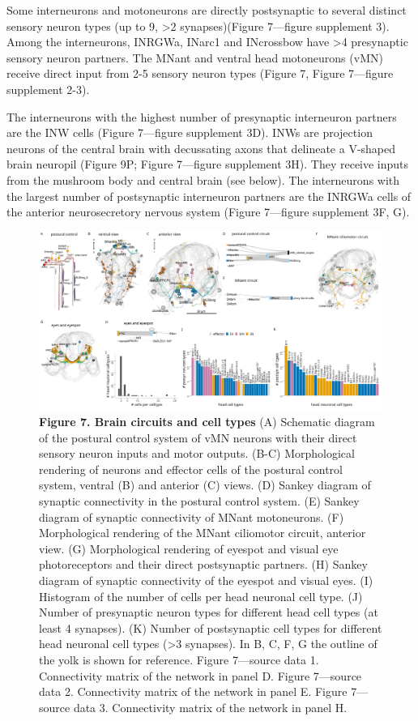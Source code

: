 \documentclass[
  11pt,
]{article}
\begin{document}
Some interneurons and motoneurons are directly postsynaptic to several
distinct sensory neuron types (up to 9, \textgreater2 synapses)(Figure
7---figure supplement 3). Among the interneurons, INRGWa, INarc1 and
INcrossbow have \textgreater4 presynaptic sensory neuron partners. The
MNant and ventral head motoneurons (vMN) receive direct input from 2-5
sensory neuron types (Figure 7, Figure 7---figure supplement 2-3).

The interneurons with the highest number of presynaptic interneuron
partners are the INW cells (Figure 7---figure supplement 3D). INWs are
projection neurons of the central brain with decussating axons that
delineate a V-shaped brain neuropil (Figure 9P; Figure 7---figure
supplement 3H). They receive inputs from the mushroom body and central
brain (see below). The interneurons with the largest number of
postsynaptic interneuron partners are the INRGWa cells of the anterior
neurosecretory nervous system (Figure 7---figure supplement 3F, G).

\begin{figure}[H]

{\centering \includegraphics[width=1\textwidth,height=\textheight]{Figures/Figure7.png}

}

\caption{\textbf{Figure 7. Brain circuits and cell types} (A) Schematic
diagram of the postural control system of vMN neurons with their direct
sensory neuron inputs and motor outputs. (B-C) Morphological rendering
of neurons and effector cells of the postural control system, ventral
(B) and anterior (C) views. (D) Sankey diagram of synaptic connectivity
in the postural control system. (E) Sankey diagram of synaptic
connectivity of MNant motoneurons. (F) Morphological rendering of the
MNant ciliomotor circuit, anterior view. (G) Morphological rendering of
eyespot and visual eye photoreceptors and their direct postsynaptic
partners. (H) Sankey diagram of synaptic connectivity of the eyespot and
visual eyes. (I) Histogram of the number of cells per head neuronal cell
type. (J) Number of presynaptic neuron types for different head cell
types (at least 4 synapses). (K) Number of postsynaptic cell types for
different head neuronal cell types (\textgreater3 synapses). In B, C, F,
G the outline of the yolk is shown for reference. Figure 7---source data
1. Connectivity matrix of the network in panel D. Figure 7---source data
2. Connectivity matrix of the network in panel E. Figure 7---source data
3. Connectivity matrix of the network in panel H.}

\end{figure}%
\end{document}
